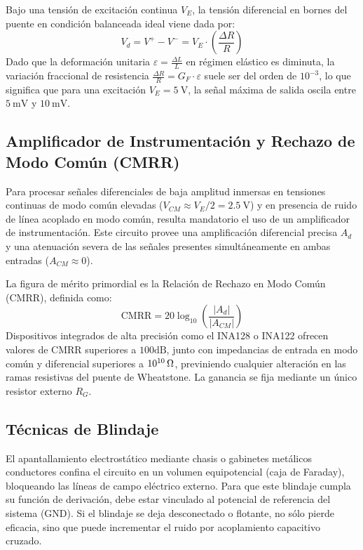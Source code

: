 Bajo una tensión de excitación continua $V_E$, la tensión diferencial en bornes del puente en condición balanceada
ideal viene dada por:
\begin{equation}
    V_d = V^+ - V^- = V_E \cdot \left( \frac{\Delta R}{R} \right)
    \label{eq.ej4:puente_balanceado}
\end{equation}
Dado que la deformación unitaria $\varepsilon = \frac{\Delta L}{L}$ en régimen elástico es diminuta, la variación
fraccional de resistencia $\frac{\Delta R}{R} = G_F \cdot \varepsilon$ suele ser del orden de $10^{-3}$, lo que
significa que para una excitación $V_E = \qty{5}{\volt}$, la señal máxima de salida oscila entre
$\qty{5}{\milli\volt}$ y $\qty{10}{\milli\volt}$.

\subsection{Amplificador de Instrumentación y Rechazo de Modo Común (CMRR)}
Para procesar señales diferenciales de baja amplitud inmersas en tensiones continuas de modo común elevadas
($V_{CM} \approx V_E / 2 = \qty{2.5}{\volt}$) y en presencia de ruido de línea acoplado en modo común, resulta
mandatorio el uso de un amplificador de instrumentación. Este circuito provee una amplificación diferencial
precisa $A_d$ y una atenuación severa de las señales presentes simultáneamente en ambas entradas ($A_{CM} \approx 0$).

La figura de mérito primordial es la Relación de Rechazo en Modo Común (CMRR), definida como:
\begin{equation}
    \text{CMRR} = 20 \log_{10}\left( \frac{|A_d|}{|A_{CM}|} \right)
    \label{eq.ej4:cmrr_def}
\end{equation}
Dispositivos integrados de alta precisión como el INA128 o INA122 ofrecen valores de CMRR superiores a
$100\si{\deci\bel}$, junto con impedancias de entrada en modo común y diferencial superiores a $10^{10}\ohm$,
previniendo cualquier alteración en las ramas resistivas del puente de Wheatstone. La ganancia se fija mediante un
único resistor externo $R_G$.

\subsection{Técnicas de Blindaje}
El apantallamiento electrostático mediante chasis o gabinetes metálicos conductores confina el circuito en un volumen
equipotencial (caja de Faraday), bloqueando las líneas de campo eléctrico externo. Para que este blindaje cumpla su
función de derivación, debe estar vinculado al potencial de referencia del sistema (GND). Si el blindaje se deja
desconectado o flotante, no sólo pierde eficacia, sino que puede incrementar el ruido por acoplamiento capacitivo
cruzado.

